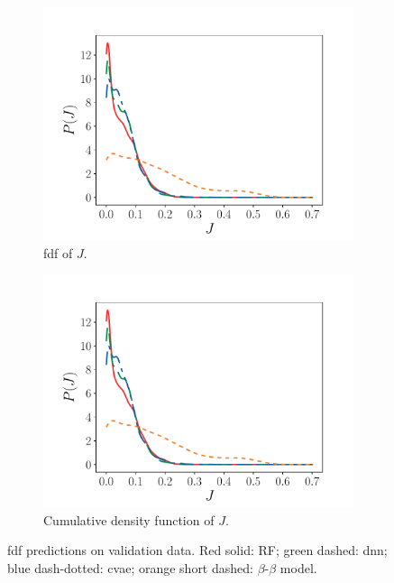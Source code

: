 \documentclass[review]{elsarticle}
\begin{document}
\begin{figure}[!tbp]%
  \centering%
  \begin{subfigure}[t]{0.48\textwidth}%
    \includegraphics[page=1,width=\textwidth, trim=0.5cm 0cm 1.5cm 1.3cm, clip=true]{./figs/jsd_dice_0004.pdf}%
    \caption{\Gls{fdf} of $J$.}\label{fig:jsd_pdf}%
  \end{subfigure}\hfill%
  \begin{subfigure}[t]{0.48\textwidth}%
    \includegraphics[page=2,width=\textwidth, trim=0.5cm 0cm 1.5cm 1.3cm, clip=true]{./figs/jsd_dice_0004.pdf}%
    \caption{Cumulative density function of $J$.}\label{fig:jsd_cdf}%
  \end{subfigure}%
  \caption{\Gls{fdf} predictions on validation data. Red solid: RF; green dashed: \gls{dnn}; blue dash-dotted: \gls{cvae}; orange short dashed: $\beta$-$\beta$ model.}\label{fig:jsd}%
\end{figure}%
\end{document}
